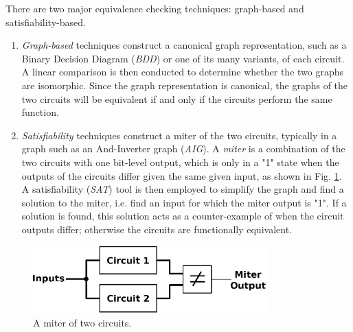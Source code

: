 There are two major
equivalence checking techniques: graph-based
and satisfiability-based.
\begin{enumerate}
\item \emph{Graph-based} techniques construct a canonical graph 
representation, such as a Binary Decision Diagram (\emph{BDD}) or one of
its many variants, of each circuit. A linear comparison is then conducted to 
determine whether the two graphs are isomorphic. Since the graph 
representation is canonical, the graphs of the two circuits will be 
equivalent if and only if the circuits perform the same function.
\item \emph{Satisfiability} techniques construct a miter of the two circuits,
typically in a graph such as an And-Inverter graph (\emph{AIG}). A
\emph{miter} is a combination of the two circuits with one bit-level output, which 
is only in a "1" state when the outputs of the circuits differ given 
the same given 
input, as shown in Fig. \ref{fig:miter}. 
A satisfiability (\emph{SAT}) tool \cite{csat} 
is then employed to simplify the graph and find a solution to the miter, 
i.e. find an input for which the 
miter output is "1". If a solution is found, this solution acts as a 
counter-example of when the circuit outputs differ; otherwise the circuits
are functionally equivalent.
\end{enumerate}


{
\begin{figure}[h]
\centerline{
\includegraphics[width=0.8\textwidth]{./figures/betterMiter}
}
\caption{A miter of two circuits.}
\label{fig:miter}
\end{figure}
}

